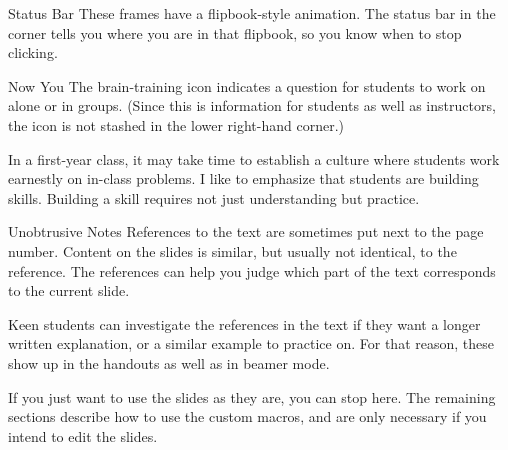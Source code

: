 \documentclass[10pt]{beamer}
\begin{document}
\begin{frame}{Status Bar}
These frames have a  flipbook-style animation. The status bar in the corner tells you where you are in that flipbook, so you know when to stop clicking.

\begin{center}
\end{center}
\end{frame}
\begin{frame}{Now You}
\NowYou The brain-training icon indicates a question for students to work on alone or in groups.
(Since this is information for students as well as instructors, the icon is not stashed in the lower right-hand corner.)
\vfill

In a first-year class, it may take time to establish a culture where students work earnestly on in-class problems. I like to emphasize that students are building skills. Building a skill requires not just understanding but practice.
\end{frame}
\begin{frame}{Unobtrusive Notes}
References to the text are sometimes put next to the page number. 
Content on the slides is similar, but usually not identical, to the reference. The references can help you judge which part of the text corresponds to the current slide.
\vfill

Keen students can investigate the references in the text if they want a longer written explanation, or a similar example to practice on. For that reason, these show up in the handouts as well as in beamer mode. 
\end{frame}
\begin{frame}
If you just want to use the slides as they are, you can stop here. 
\vfill
The remaining sections describe how to use the custom macros, and are only necessary if you intend to \alert{edit} the slides.
\end{frame}
\end{document}
